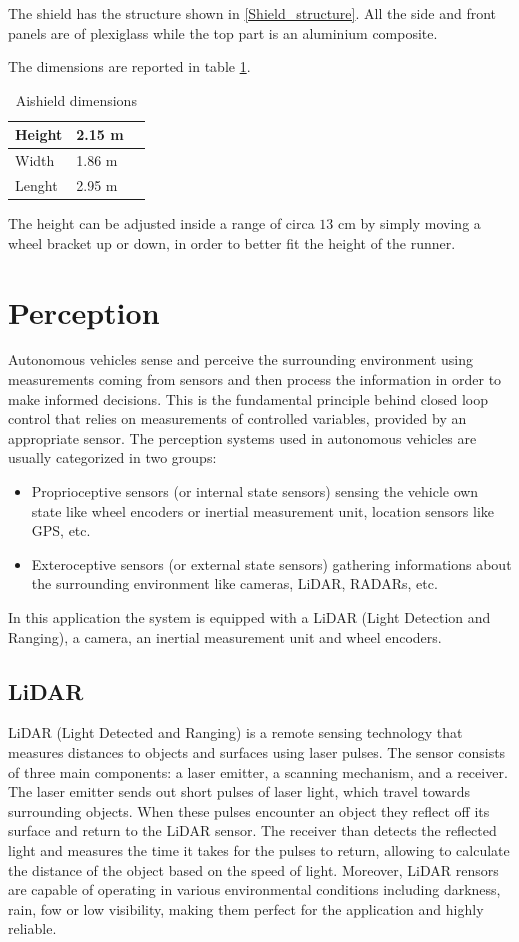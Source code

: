\documentclass[a4paper,12pt,oneside]{book}
\begin{document}
The shield has the structure shown in \ref{Shield_structure}.
All the side and front panels are of plexiglass while the top part is an aluminium composite.

The dimensions are reported in table \ref{tab:Shield_dimensions}.

\begin{table}[h]
\centering
\begin{tabular}{|p{1.5cm}|p{1.5cm}|p{1.5cm}|}
\hline
Height & 2.15 m \\
\hline
Width & 1.86 m \\
\hline
Lenght & 2.95 m \\
\hline
\end{tabular}
\caption{Aishield dimensions}
\label{tab:Shield_dimensions}
\end{table}
The height can be adjusted inside a range of circa $13$ cm by simply moving a wheel bracket up or down, in order to better fit the height of the runner.

\section{Perception}
Autonomous vehicles sense and perceive the surrounding environment using measurements coming from sensors and then process the information in order to make informed decisions. 
This is the fundamental principle behind closed loop control that relies on measurements of controlled variables, provided by an appropriate sensor.
The perception systems used in autonomous vehicles are usually categorized in two groups:
\begin{itemize}
    \item Proprioceptive sensors (or internal state sensors) sensing the vehicle own state like wheel encoders or inertial measurement unit, location sensors like GPS, etc.
    \item Exteroceptive sensors (or external state sensors) gathering informations about the surrounding environment like cameras, LiDAR, RADARs, etc.
\end{itemize}
In this application the system is equipped with a LiDAR (Light Detection and Ranging), a camera, an inertial measurement unit and wheel encoders.

\subsection*{LiDAR}
LiDAR (Light Detected and Ranging) is a remote sensing technology that measures distances to objects and surfaces using laser pulses. 
The sensor consists of three main components: a laser emitter, a scanning mechanism, and a receiver.
The laser emitter sends out short pulses of laser light, which travel towards surrounding objects. 
When these pulses encounter an object they reflect off its surface and return to the LiDAR sensor.
The receiver than detects the reflected light and measures the time it takes for the pulses to return, allowing to calculate the distance of the object based on the speed of light.
Moreover, LiDAR rensors are capable of operating in various environmental conditions including darkness, rain, fow or low visibility, making them perfect for the application and highly reliable.
\end{document}
